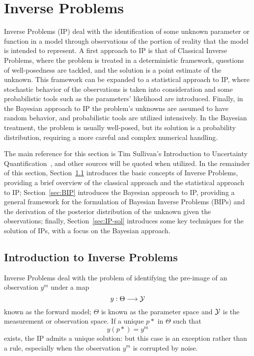 \section{Inverse Problems} \label{sec:IP}
Inverse Problems (IP) deal with the identification of some unknown parameter or function in a model through observations of the portion of reality that the model is intended to represent. \newline
A first approach to IP is that of Classical Inverse Problems, where the problem is treated in a deterministic framework, questions of well-posedness are tackled, and the solution is a point estimate of the unknown. 
This framework can be expanded to a statistical approach to IP, where stochastic behavior of the observations is taken into consideration and some probabilistic tools such as the parameters' likelihood are introduced.
Finally, in the Bayesian approach to IP the problem's unknowns are assumed to have random behavior, and probabilistic tools are utilized intensively. 
In the Bayesian treatment, the problem is usually well-posed, but its solution is a probability distribution, requiring a more careful and complex numerical handling.\medskip

The main reference for this section is Tim Sullivan's Introduction to Uncertainty Quantification~\cite{Sullivan2015}, and other sources will be quoted when utilized. \newline
In the remainder of this section, Section~\ref{sec:IP-intro} introduces the basic concepts of Inverse Problems, providing a brief overview of the classical approach and the statistical approach to IP; Section~\ref{sec:BIP} introduces the Bayesian approach to IP, providing a general framework for the formulation of Bayesian Inverse Problems (BIPs) and the derivation of the posterior distribution of the unknown given the observations; finally, Section~\ref{sec:IP-sol} introduces some key techniques for the solution of IPs, with a focus on the Bayesian approach. 

\subsection{Introduction to Inverse Problems}\label{sec:IP-intro}

Inverse Problems deal with the problem of identifying the pre-image of an observation $y^m$ under a map \[y : \Theta \longrightarrow \mathcal Y \] known as the forward model; $\Theta$ is known as the parameter space and $\mathcal Y$ is the measurement or observation space.
If a unique $p*$ in $\Theta$ such that
\begin{equation}\label{eq:IP0}
    y(p*) = y^m
\end{equation}
exists, the IP admits a unique solution: but this case is an exception rather than a rule, especially when the observation $y^m$ is corrupted by noise.

